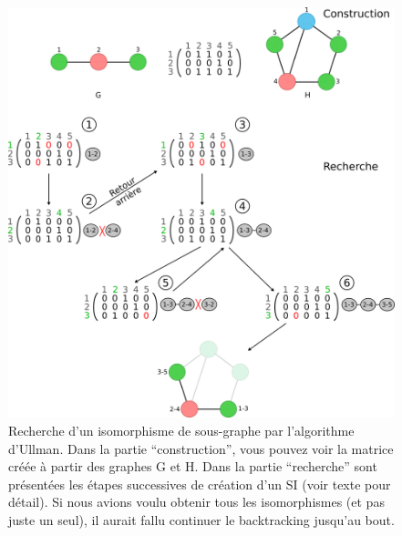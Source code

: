 \begin{figure}[!ht]
  \begin{center}
    \includegraphics[width=450px]{Figures/s2m/MCS-SI/ullman.png}
    \caption{\label{ullman_fig}Recherche d'un isomorphisme de sous-graphe par l'algorithme d'Ullman.
    Dans la partie ``construction'', vous pouvez voir la matrice créée à partir des graphes G et H.
    Dans la partie ``recherche'' sont présentées les étapes successives de création d'un SI (voir texte pour détail).
    Si nous avions voulu obtenir tous les isomorphismes (et pas juste un seul), il aurait fallu continuer le backtracking jusqu'au bout.}
  \end{center}
\end{figure}

